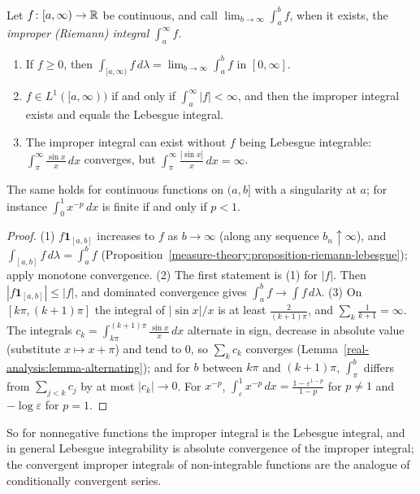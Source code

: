 \begin{proposition}\label{measure-theory:proposition-improper}
Let $f \colon [a, \infty) \to \mathbb{R}$ be continuous, and call $\lim_{b \to \infty}\int_a^bf$, when it exists, the \emph{improper (Riemann) integral} $\int_a^\infty f$.
\begin{enumerate}
\item If $f \geq 0$, then $\int_{[a, \infty)}f\,d\lambda = \lim_{b \to \infty}\int_a^bf$ in $[0, \infty]$.
\item $f \in L^1([a, \infty))$ if and only if $\int_a^\infty|f| < \infty$, and then the improper integral exists and equals the Lebesgue integral.
\item The improper integral can exist without $f$ being Lebesgue integrable: $\int_\pi^\infty\frac{\sin x}{x}\,dx$ converges, but $\int_\pi^\infty\frac{|\sin x|}{x}\,dx = \infty$.
\end{enumerate}
The same holds for continuous functions on $(a, b]$ with a singularity at $a$; for instance $\int_0^1x^{-p}\,dx$ is finite if and only if $p < 1$.
\end{proposition}

\begin{proof}
(1) $f\mathbf{1}_{[a, b]}$ increases to $f$ as $b \to \infty$ (along any sequence $b_n \uparrow \infty$), and $\int_{[a, b]}f\,d\lambda = \int_a^bf$ (Proposition~\ref{measure-theory:proposition-riemann-lebesgue});
apply monotone convergence. (2) The first statement is (1) for $|f|$. Then $|f\mathbf{1}_{[a, b]}| \leq |f|$, and dominated convergence gives $\int_a^bf \to \int f\,d\lambda$. (3) On
$[k\pi, (k + 1)\pi]$ the integral of $|\sin x|/x$ is at least $\frac{2}{(k + 1)\pi}$, and $\sum_k\frac1{k + 1} = \infty$. The integrals $c_k = \int_{k\pi}^{(k+1)\pi}\frac{\sin x}{x}\,dx$ alternate in sign,
decrease in absolute value (substitute $x \mapsto x + \pi$) and tend to $0$, so $\sum_kc_k$ converges (Lemma~\ref{real-analysis:lemma-alternating}); and for $b$ between $k\pi$ and $(k + 1)\pi$,
$\int_\pi^b$ differs from $\sum_{j < k}c_j$ by at most $|c_k| \to 0$. For $x^{-p}$, $\int_\varepsilon^1x^{-p}\,dx = \frac{1 - \varepsilon^{1-p}}{1 - p}$ for $p \neq 1$ and $-\log\varepsilon$ for $p = 1$.
\end{proof}

So for nonnegative functions the improper integral is the Lebesgue integral, and in general Lebesgue integrability is absolute convergence of the improper integral; the convergent improper integrals
of non-integrable functions are the analogue of conditionally convergent series.

